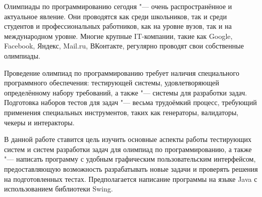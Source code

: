 Олимпиады по программированию сегодня "--- очень распространённое и актуальное явление. Они проводятся как среди школьников, так и среди студентов и профессиональных работников, как на уровне вузов, так и на международном уровне. Многие крупные IT-компании, такие как Google, Facebook, Яндекс, Mail.ru, ВКонтакте, регулярно проводят свои собственные олимпиады.

Проведение олимпиад по программированию требует наличия специального программного обеспечения: тестирующей системы, удовлетворяющей определённому набору требований, а также "--- системы для разработки задач. Подготовка наборов тестов для задач "--- весьма трудоёмкий процесс, требующий применения специальных инструментов, таких как генераторы, валидаторы, чекеры и интеракторы.

В данной работе ставится цель изучить основные аспекты работы тестирующих систем и систем разработки задач для олимпиад по программированию, а также "--- написать программу с удобным графическим пользовательским интерфейсом, предоставляющую возможность разрабатывать новые задачи и проверять решения на подготовленных тестах. Предполагается написание программы на языке Java с использованием библиотеки Swing.